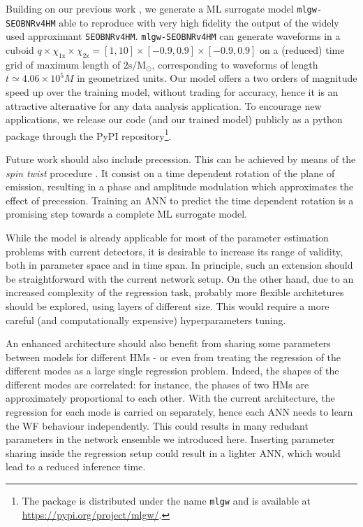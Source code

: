 \documentclass[twocolumn,showpacs,preprintnumbers,nofootinbib,prd,
superscriptaddress,10pt]{revtex4-2}
\begin{document}
Building on our previous work \cite{Schmidt:2020yuu, Tissino:2022thn}, we generate a ML surrogate model \texttt{mlgw-SEOBNRv4HM} able to reproduce with very high fidelity the output of the widely used approximant \texttt{SEOBNRv4HM}. \texttt{mlgw-SEOBNRv4HM} can generate waveforms in a cuboid $q\times \chi_\text{1z} \times \chi_\text{2z} = [1,10]\times[-0.9,0.9]\times[-0.9,0.9]$ on a (reduced) time grid of maximum length of $2 \textrm{s}/\textrm{M}_\odot$, corresponding to waveforms of length $t \simeq 4.06\times 10^5 M$ in geometrized units.
Our model offers a two orders of magnitude speed up over the training model, without trading for accuracy, hence it is an attractive alternative for any data analysis application.
To encourage new applications, we release our code (and our trained model) publicly as a python package through the PyPI repository\footnote{The package is distributed under the name \texttt{mlgw} and is available at \url{https://pypi.org/project/mlgw/}.}.

Future work should also include precession. This can be achieved by means of the {\it spin twist} procedure \cite{Schmidt:2012rh, Schmidt:2014iyl, Pratten:2020ceb, Gamba:2021ydi}. It consist on a time dependent rotation of the plane of emission, resulting in a phase and amplitude modulation which approximates the effect of precession.
Training an ANN to predict the time dependent rotation is a promising step towards a complete ML surrogate model.

While the model is already applicable for most of the parameter estimation problems with current detectors, 
it is desirable to increase its range of validity, both in parameter space and in time span.
In principle, such an extension should be straightforward with the current network setup. On the other hand, due to an increased complexity of the regression task, probably more flexible architetures should be explored, using layers of different size. This would require a more careful (and computationally expensive) hyperparameters tuning.

An enhanced architecture should also benefit from sharing some parameters between models for different HMs - or even from treating the regression of the different modes as a large single regression problem. Indeed, the shapes of the different modes are correlated: for instance, the phases of two HMs are approximately proportional to each other. 
With the current architecture, the regression for each mode is carried on separately, hence each ANN needs to learn the WF behaviour independently. 
This could results in many redudant parameters in the network ensemble we introduced here.
Inserting parameter sharing inside the regression setup could result in a lighter ANN, which would lead to a reduced inference time.
\end{document}
